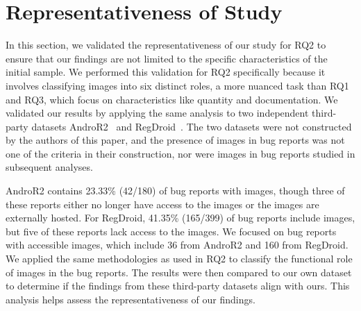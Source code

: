 
\section{Representativeness of Study} 
\label{sec:general}
In this section, we validated the representativeness of our study for RQ2 to ensure that our findings are not limited to the specific characteristics of the initial sample. We performed this validation for RQ2 specifically because it involves classifying images into six distinct roles, a more nuanced task than RQ1 and RQ3, which focus on characteristics like quantity and documentation.
%
We validated our results by applying the same analysis to two independent third-party datasets 
 AndroR2~\cite{wendland2021andror2, johnson2022empirical} and RegDroid~\cite{xiong2023empirical}.  
 The two datasets were not constructed by the authors of this paper, and the presence of images in bug reports was not one of the criteria in their construction, nor were images in bug reports studied in subsequent analyses.

 AndroR2 contains 23.33\% (42/180) of bug reports with images, though three of these reports either no longer have access to the images or the images are externally hosted. For RegDroid, 41.35\% (165/399) of bug reports include images, but five of these reports lack access to the images. We focused on bug reports with accessible images, which include 36 from AndroR2 and 160 from RegDroid. We applied the same methodologies as used in  RQ2  to classify the functional role of images in the bug reports. The results were then compared to our own dataset to determine if the findings from these third-party datasets align with ours. This analysis helps assess the representativeness of our findings.

